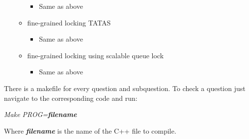 \begin{itemize}
\begin{itemize}
\begin{itemize}
                    \item Same as above
                \end{itemize}
            \item fine-grained locking TATAS
                \begin{itemize}
                    \item Same as above
                \end{itemize}
            \item fine-grained locking using scalable queue lock
                \begin{itemize}
                    \item Same as above
                \end{itemize}
        \end{itemize}
\end{itemize}

There is a makefile for every question and subquestion. To check a question
just navigate to the corresponding code and run:

\begin{center}
    \textit{Make PROG=\textbf{filename}}
\end{center}

Where \textit{\textbf{filename}} is the name of the C++ file to compile.